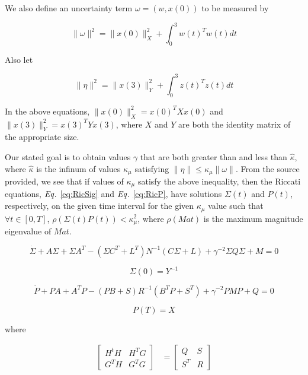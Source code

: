 \documentclass[12pt, notitlepage, letterpaper]{article}
\begin{document}
We also define an uncertainty term $\omega = (w,x(0))$ to be measured by

\begin{equation}
\label{eq:omgNorm}
\|\omega\|^2 = \|x(0)\|^2_X + \int_{0}^{3}w(t)^Tw(t) dt
\end{equation}

Also let

\begin{equation}
\label{eq:etaNorm}
\|\eta\|^2 = \|x(3)\|^2_Y + \int_{0}^{3}z(t)^Tz(t) dt
\end{equation}

In the above equations, $\|x(0)\|^2_X = x(0)^TXx(0)$ and $\|x(3)\|^2_Y = x(3)^TYx(3)$, where $X$ and $Y$ are both the identity matrix of the appropriate size.  

Our stated goal is to obtain values $\gamma$ that are both greater than and less than $\hat{\kappa}$, where $\hat{\kappa}$ is the infinum of values $\kappa_{\mu}$ satisfying $\|\eta\| \leq \kappa_{\mu}\|\omega\|$.  From the source provided, we see that if values of $\kappa_{\mu}$ satisfy the above inequality, then the Riccati equations, $\it{Eq.}$ \ref{eq:RicSig} and $\it{Eq.}$ \ref{eq:RicP}, have solutions $\Sigma(t)$ and $P(t)$, respectively, on the given time interval for the given $\kappa_{\mu}$ value such that $\forall{t} \in[0,T]$,  $\rho(\Sigma(t)P(t)) < \kappa_{\mu}^2$, where $\rho(Mat)$ is the maximum magnitude eigenvalue of $Mat$.


\begin{equation}
\label{eq:RicSig}
\dot{\Sigma} + A \Sigma  + \Sigma A^T - ( \Sigma C^T + L^T)N^{-1} (C \Sigma + L) + \gamma^{-2} \Sigma  Q \Sigma  + M = 0
\end{equation}

\begin{equation}
\Sigma (0) = Y^{-1}
\end{equation}

\begin{equation}
\label{eq:RicP}
\dot{P} + PA + A^TP - (PB + S)R^{-1}(B^TP+S^T) + \gamma^{-2}PMP + Q = 0
\end{equation}

\begin{equation}
P(T) = X
\end{equation}

where

\begin{align}
\begin{bmatrix}
H^tH & H^TG \\
G^TH & G^TG
\end{bmatrix}
&=
\begin{bmatrix}
Q & S \\
S^T & R
\end{bmatrix}
\end{align}
\end{document}

